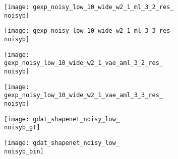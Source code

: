 \begin{figure*}[t]
{\begin{subfigure}[t]{1\textwidth}
\begin{subfigure}[t]{0.095\textwidth}
            \texttt{[image: gexp\_noisy\_low\_10\_wide\_w2\_1\_ml\_3\_2\_res\_\\noisyb]}
        \end{subfigure}
        \begin{subfigure}[t]{0.095\textwidth}
        	\vspace{0px}\centering
        	\texttt{[image: gexp\_noisy\_low\_10\_wide\_w2\_1\_ml\_3\_3\_res\_\\noisyb]}
        \end{subfigure}
        \begin{subfigure}[t]{0.095\textwidth}
        	\vspace{0px}\centering
        	\texttt{[image: gexp\_noisy\_low\_10\_wide\_w2\_1\_vae\_aml\_3\_2\_res\_\\noisyb]}
        \end{subfigure}
        \begin{subfigure}[t]{0.095\textwidth}
        	\vspace{0px}\centering
        	\texttt{[image: gexp\_noisy\_low\_10\_wide\_w2\_1\_vae\_aml\_3\_3\_res\_\\noisyb]}
        \end{subfigure}
        \begin{subfigure}[t]{0.095\textwidth}
        	\vspace{0px}\centering
        	\texttt{[image: gdat\_shapenet\_noisy\_low\_\\noisyb\_gt]}
        \end{subfigure}
        \begin{subfigure}[t]{0.095\textwidth}
        	\vspace{0px}\centering
        	\texttt{[image: gdat\_shapenet\_noisy\_low\_\\noisyb\_bin]}
        \end{subfigure}
    \end{subfigure}
    \\[4px]
    \begin{subfigure}[t]{1\textwidth}

\end{subfigure}}
\end{figure*}
